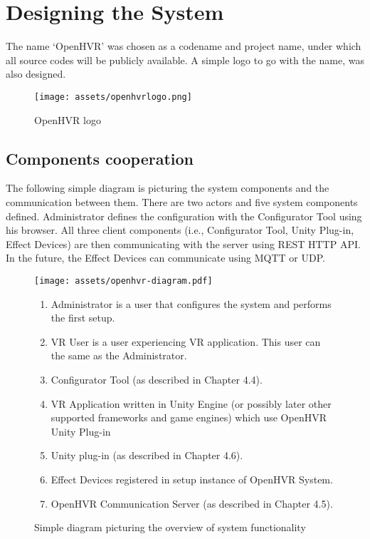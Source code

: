 \chapter{Designing the System}

The name `OpenHVR' was chosen as a codename and project name, under which
all source codes will be publicly available. A simple logo to
go with the name, was also designed.

\begin{figure}[h]{}
\centering\texttt{[image: assets/openhvrlogo.png]}
\caption{OpenHVR logo}
\end{figure}

\hypertarget{x-components-cooperation}{\section{Components cooperation}}
The following simple diagram is picturing the system components and the
communication between them. There are two actors and five system
components defined. Administrator defines the configuration with the
Configurator Tool using his browser. All three client components
(i.e., Configurator Tool, Unity Plug-in, Effect Devices) are then communicating
with the server using REST HTTP API. In the future, the Effect Devices
can communicate using MQTT or UDP.


\begin{figure}[h]{}
\centering\texttt{[image: assets/openhvr-diagram.pdf]}
\caption{Simple diagram picturing the overview of system functionality}
\begin{enumerate}
    \item Administrator is a user that configures the system and performs the first setup.
    \item VR User is a user experiencing VR application. This user can the same as the Administrator.
    \item Configurator Tool (as described in Chapter 4.4).
    \item VR Application written in Unity Engine (or possibly later other supported frameworks and game engines) which use OpenHVR Unity Plug-in
    \item Unity plug-in (as described in Chapter 4.6).
    \item Effect Devices registered in setup instance of OpenHVR System.
    \item OpenHVR Communication Server (as described in Chapter 4.5).
\end{enumerate}
\end{figure}


